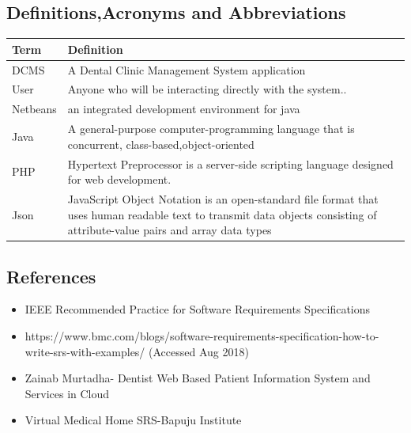 \documentclass[11 pt]{article}
\begin{document}
\subsection{Definitions,Acronyms and Abbreviations}
\begin{tabular}{|p{3cm}|p{9cm}|}
\hline
\textbf{Term} & \textbf{Definition}\\
\hline
DCMS &  A Dental Clinic Management System application\\
\hline
User &  Anyone who will be interacting directly with the system..\\
\hline
Netbeans & an integrated development environment for java\\
\hline
Java & A general-purpose computer-programming language that is concurrent, class-based,object-oriented\\
\hline
PHP & Hypertext Preprocessor is a server-side scripting language designed for web development. \\
\hline
Json & JavaScript Object Notation is an open-standard file format that uses human readable text to transmit data objects consisting of attribute-value pairs and array data types \\
\hline
\end{tabular}

\subsection{References}
\begin{itemize}
    \item    
    IEEE Recommended Practice for Software Requirements Specifications
    \item
    https://www.bmc.com/blogs/software-requirements-specification-how-to-write-srs-with-examples/ (Accessed Aug 2018)
    \item
    Zainab Murtadha- Dentist Web Based Patient Information System and Services in Cloud
    \item
    Virtual Medical Home SRS-Bapuju Institute
    \end{itemize}
    \newpage
\end{document}
